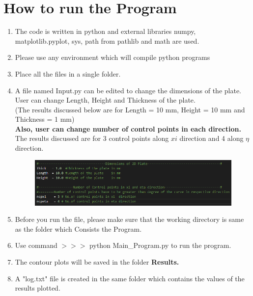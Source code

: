 \documentclass[12pt]{article}
\begin{document}
\section{How to run the Program}
\begin{enumerate}[leftmargin=*]
	\item The code is written in python and external libraries numpy, matplotlib.pyplot, sys, path from pathlib and math are used.
	\item Please use any environment which will compile python programs
	\item Place all the files in a single folder.
	\item A file named Input.py can be edited to change the dimensions of the plate. User can change Length, Height and Thickness of the plate. \\(The results discussed below are for Length = 10 mm, Height = 10 mm and Thickness = 1 mm) \\
	\textbf{Also, user can change number of control points in each direction.}\\
	The results discussed are for 3 control points along $xi$ direction and 4 along $\eta$ direction.
	\begin{figure}[H]
		\begin{center}
			\includegraphics[scale=0.8]{Manual_2parameters.png} 
		\end{center}	
	\end{figure}
	\item Before you run the file, please make sure that the working directory is same as the folder  which
	Consists the Program.
	\item Use command  $>>>$ python Main\_Program.py to run the program.
	\item The contour plots will be saved in the folder \textbf{Results.}
	\item A "log.txt" file is created in the same folder which contains the values of the results plotted.
	
	
\end{enumerate}

\newpage
\end{document}
